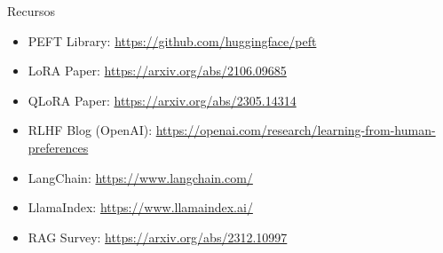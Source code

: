 
\begin{frame}{Recursos}
\begin{itemize}
    \item PEFT Library: \url{https://github.com/huggingface/peft}
    \item LoRA Paper: \url{https://arxiv.org/abs/2106.09685}
    \item QLoRA Paper: \url{https://arxiv.org/abs/2305.14314}
    \item RLHF Blog (OpenAI): \url{https://openai.com/research/learning-from-human-preferences}
    \item LangChain: \url{https://www.langchain.com/}
    \item LlamaIndex: \url{https://www.llamaindex.ai/}
    \item RAG Survey: \url{https://arxiv.org/abs/2312.10997}
\end{itemize}
\end{frame}


